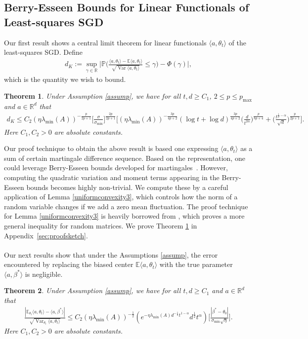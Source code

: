 \documentclass[11pt, reqno,english]{amsart}
\DeclareMathOperator{\Var}{Var} \DeclareMathOperator{\N}{N}
\newtheorem{theorem}{Theorem}[section]
\begin{document}
\subsection{Berry-Esseen Bounds for Linear Functionals of Least-squares SGD}\label{eq:beb}
Our first result shows a central limit theorem for linear functionals $\langle a, \theta_t \rangle$ of the least-squares SGD. Define
\begin{align*}
d_K := \sup_{\gamma \in \mathbb{R}} \bigg|\mathbb{P}\bigg(\frac{\langle a, \theta_t \rangle - \mathbb{E}\langle a, \theta_t \rangle}{\sqrt{\Var \langle a, \theta_t \rangle}}\leq \gamma\bigg) - \Phi(\gamma)\bigg|,    
\end{align*}
which is the quantity we wish to bound.
\begin{theorem}\label{th-1}
Under Assumption \ref{assump}, we have for all $t,d \geq C_1$, $2 \leq p \leq p_{\max}$ and $a \in \mathbb{R}^d$ that
\begin{align*}
    d_K\leq C_2(\eta \lambda_{\min}(A))^{-\frac{p}{2p+1}}\Big[\frac{\sigma}{\sigma_{\min}}\Big]^{\frac{2p}{2p+1}}\bigg[(\eta \lambda_{\min}(A))^{-\frac{3p}{4p+2}}(\log t + \log d)^{\frac{3p}{4p+2}}\Big(\frac{d}{t^{2\alpha}}\Big)^{\frac{p}{8p+4}} + \Big(\frac{t^{\frac{1}{p}-\alpha}}{\sqrt{d}}\Big)^{\frac{p}{2p+1}}\bigg].
\end{align*}
Here $C_1, C_2 > 0$ are absolute constants.
\end{theorem}
Our proof technique to obtain the above result is based one expressing $\langle a, \theta_t \rangle $ as a sum of certain martingale difference sequence. Based on the representation, one could leverage Berry-Esseen bounds developed for martingales~\cite{bolthausen1982exact,mourrat2013rate}. However, computing the quadratic variation and moment terms appearing in the Berry-Esseen bounds becomes highly non-trivial. We compute these by a careful application of Lemma \ref{uniformconvexity3}, which controls how the norm of a random variable changes if we add a zero mean fluctuation. The proof technique for Lemma \ref{uniformconvexity3} is heavily borrowed from \cite{huang2022matrix}, which proves a more general inequality for random matrices.   We prove Theorem \ref{th-1} in Appendix~\ref{sec:proofsketch}. 
\\\\
Our next results show that under the Assumptions \ref{assump}, the error encountered by replacing the biased center $\mathbb{E}\langle a, \theta_t \rangle$ with the true parameter $\langle a, \beta^* \rangle$ is negligible.
\begin{theorem}\label{bias-correction-term}
Under Assumption \ref{assump}, we have for all $t,d \geq C_1$ and $a \in \mathbb{R}^d$ that
\begin{align*}
\frac{|\mathbb{E}_{\theta_t}\langle a, \theta_t \rangle - \langle a, \beta^* \rangle |}{\sqrt{\Var_{\theta_t} \langle a, \theta_t \rangle}} \leq C_2(\eta \lambda_{\min}(A))^{-\frac{1}{2}}(e^{-\eta \lambda_{\min}(A)d^{-\frac{1}{2}}t^{1-\alpha}}d^{\frac{1}{2}}t^{\alpha})\bigg[\frac{|\beta^* - \theta_0|}{\sigma_{\min}\sqrt{\eta}}\bigg].
\end{align*} 
Here $C_1, C_2 > 0$ are absolute constants. 
\end{theorem}
\end{document}

